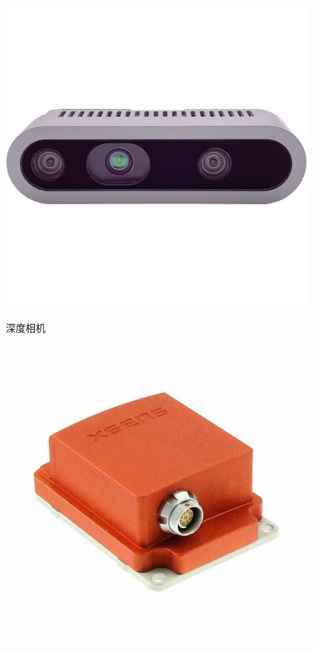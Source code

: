 \begin{figure}[htbp]
    \centering
    \begin{minipage}{0.32\textwidth}
    \centering
    \includegraphics[width=\textwidth]{figures/visual_sensor.jpeg}
    \caption[subfig:rgbd_camera]{}{深度相机}
    \end{minipage}
    \centering
    \begin{minipage}{0.32\textwidth}
    \centering
    \includegraphics[width=\textwidth]{figures/inertial_sensor.jpeg}

\end{minipage}
\end{figure}
